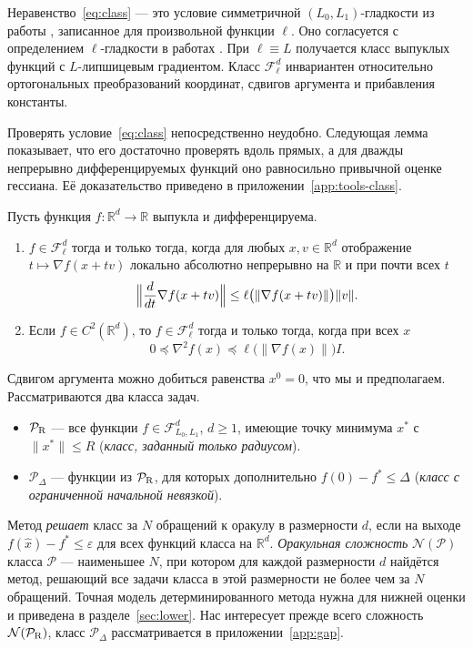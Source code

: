 \documentclass[11pt,a4paper]{article}
\newcommand{\R}{\mathbb R}
\newcommand{\F}{\mathcal F}
\newcommand{\norm}[1]{\|#1\|}
\begin{document}
Неравенство~\eqref{eq:class} --- это условие симметричной $(L_0,L_1)$-гладкости из работы \citet[предположение~1.3]{gorbunov2024methods}, записанное для произвольной функции $\ell$. Оно согласуется с определением $\ell$-гладкости в работах \citet{li2023generalized,tyurin2025unified}. При $\ell\equiv L$ получается класс выпуклых функций с $L$-липшицевым градиентом. Класс $\F_\ell^d$ инвариантен относительно ортогональных преобразований координат, сдвигов аргумента и прибавления константы.

Проверять условие~\eqref{eq:class} непосредственно неудобно. Следующая лемма показывает, что его достаточно проверять вдоль прямых, а для дважды непрерывно дифференцируемых функций оно равносильно привычной оценке гессиана. Её доказательство приведено в приложении~\ref{app:tools-class}.

\begin{lemma}\label{lem:class}
Пусть функция $f:\R^d\to\R$ выпукла и дифференцируема.
\begin{enumerate}
\item[(а)] $f\in\F_\ell^d$ тогда и только тогда, когда для любых $x,v\in\R^d$ отображение $t\mapsto\nabla f(x+tv)$ локально абсолютно непрерывно на $\R$ и при почти всех $t$
\begin{equation}\label{eq:line-derivative}
 \Bigl\|\frac{d}{dt}\nabla f(x+tv)\Bigr\|\le\ell\bigl(\norm{\nabla f(x+tv)}\bigr)\norm v .
\end{equation}
\item[(б)] Если $f\in C^2(\R^d)$, то $f\in\F_\ell^d$ тогда и только тогда, когда при всех $x$
\begin{equation}\label{eq:hessian-bound}
 0\preceq\nabla^2f(x)\preceq\ell\bigl(\norm{\nabla f(x)}\bigr)I .
\end{equation}
\end{enumerate}
\end{lemma}

Сдвигом аргумента можно добиться равенства $x^0=0$, что мы и предполагаем. Рассматриваются два класса задач.
\begin{itemize}
\item $\mathcal P_{\rm R}$ --- все функции $f\in\F_{L_0,L_1}^d$, $d\ge1$, имеющие точку минимума $x^\ast$ с $\norm{x^\ast}\le R$ (\emph{класс, заданный только радиусом}).
\item $\mathcal P_\Delta$ --- функции из $\mathcal P_{\rm R}$, для которых дополнительно $f(0)-f^\ast\le\Delta$ (\emph{класс с ограниченной начальной невязкой}).
\end{itemize}
Метод \emph{решает} класс за $N$ обращений к оракулу в размерности $d$, если на выходе $f(\hat x)-f^\ast\le\varepsilon$ для всех функций класса на $\R^d$. \emph{Оракульная сложность} $\mathcal N(\mathcal P)$ класса $\mathcal P$ --- наименьшее $N$, при котором для каждой размерности $d$ найдётся метод, решающий все задачи класса в этой размерности не более чем за $N$ обращений. Точная модель детерминированного метода нужна для нижней оценки и приведена в разделе~\ref{sec:lower}. Нас интересует прежде всего сложность $\mathcal N(\mathcal P_{\rm R})$, класс $\mathcal P_\Delta$ рассматривается в приложении~\ref{app:gap}.
\end{document}
